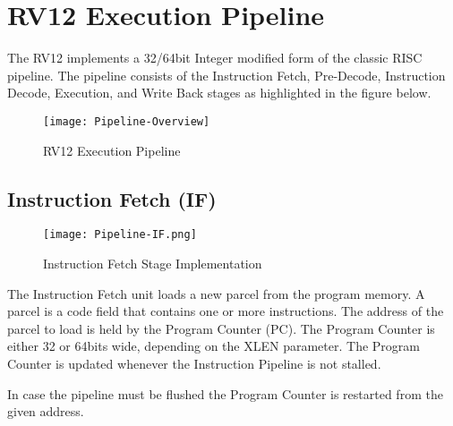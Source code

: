 \chapter{RV12 Execution Pipeline}

The RV12 implements a 32/64bit Integer modified form of the classic RISC pipeline. The pipeline consists of the Instruction Fetch, Pre-Decode, Instruction Decode, Execution, and Write Back stages as highlighted in the figure below.
 

\begin{figure}[h]
  \texttt{[image: Pipeline-Overview]}
  \caption{RV12 Execution Pipeline}
\end{figure}

\pagebreak

\section{Instruction Fetch (IF)}\label{instruction-fetch-if}

\begin{figure}[h]
  \texttt{[image: Pipeline-IF.png]}
  \caption{Instruction Fetch Stage Implementation}
\end{figure}

The Instruction Fetch unit loads a new parcel from the program memory.
A parcel is a code field that contains one or more instructions. The address of the parcel to load is held by the Program Counter (PC). The Program Counter is either 32 or 64bits wide, depending on the XLEN parameter. The Program Counter is updated whenever the Instruction Pipeline is not stalled.

In case the pipeline must be flushed the Program Counter is restarted from the given address.

